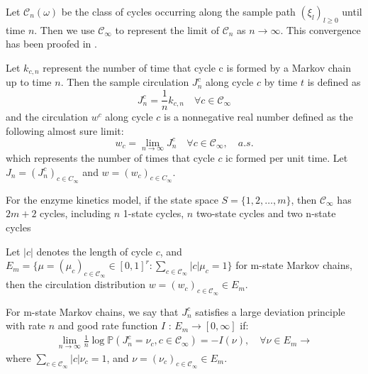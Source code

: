 \documentclass[11pt,en,cite=authoryear]{elegantpaper}
\begin{document}
\begin{definition}
    Let $\mathcal{C}_n(\omega)$ be the class of cycles occurring along the sample path $(\xi_l)_{l\ge 0}$ until time $n$. Then we use $\mathcal{C}_{\infty}$ to represent the limit of $\mathcal{C}_n$ as $n \rightarrow \infty$. This convergence has been proofed in \cite{jiang2004mathematical}.
\end{definition}

\begin{definition} %
    Let $k_{c, n}$ represent the number of time that cycle c is formed by a Markov chain up to time $n$. Then the sample circulation $J_{n}^c$ along cycle $c$ by time $t$ is defined as
    $$
    J_{n}^c = \frac{1}{n} k_{c, n} \quad \forall c \in \mathcal{C}_{\infty}
    $$
    and the circulation $w^c$ along cycle $c$ is a nonnegative real number defined as the following almost sure limit:
    $$
    w_c = \lim_{n \rightarrow \infty} J_{n}^c \quad \forall c \in \mathcal{C}_{\infty}, \quad a.s.
    $$
    which represents the number of times that cycle $c$ ic formed per unit time. Let $J_n = (J_n^c)_{c \in C_{\infty}}$ and $w =  (w_c)_{c \in C_{\infty}}$.
\end{definition}

For the enzyme kinetics model, if the state space $S=\{1, 2, \dots, m\}$, then $\mathcal{C}_{\infty}$ has $2m+2$ cycles, including $n$ 1-state cycles, $n$ two-state cycles and two n-state cycles

Let $|c|$ denotes the length of cycle $c$, and 
$E_m = \{\mu=(\mu_c)_{c\in \mathcal{C}_{\infty}} \in [0, 1]^r :\sum_{c \in \mathcal{C}_{\infty}} |c| \mu_c  = 1\}$ for m-state Markov chains, then the circulation distribution $w = (w_{c})_{c \in \mathcal{C}_{\infty}} \in E_m$.

\begin{definition}
    For m-state Markov chains, we say that $J_{n}^c$ satisfies a large deviation principle with rate $n$ and good rate function $I$ : $E_m \rightarrow [0, \infty]$ if:
    \begin{align}
        \lim_{n \rightarrow \infty} \frac{1}{n} \log \mathbb{P}(J_{n}^c = \nu_c , c \in \mathcal{C}_{\infty}) = - I(\nu), \quad \forall \nu \in E_m \rightarrow
    \end{align}
    where $\sum_{c \in \mathcal{C}_{\infty}} |c| \nu_c = 1$, 
    and $\nu = (\nu_c)_{c \in \mathcal{C}_{\infty}} \in E_m$.
\end{definition}
\end{document}
